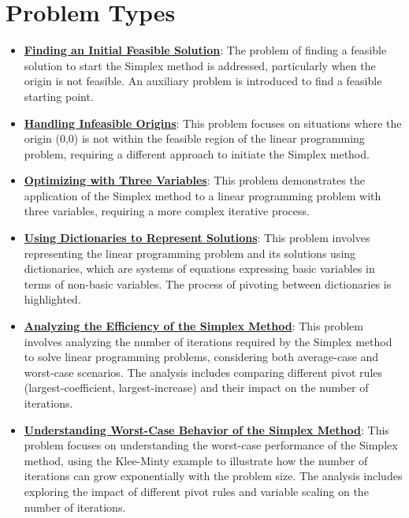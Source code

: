 \documentclass{article}%
\begin{document}
%
\section{Problem Types}%
\label{sec:ProblemTypes}%
\begin{itemize}[leftmargin=*]%
\item \href{https://www.math.purdue.edu/~yipn/421/2024-08-27-ExSimplex.pdf#page=32}{\textbf{Finding an Initial Feasible Solution}}: The problem of finding a feasible solution to start the Simplex method is addressed, particularly when the origin is not feasible. An auxiliary problem is introduced to find a feasible starting point.%
\item \href{https://www.math.purdue.edu/~yipn/421/2024-08-27-ExSimplex.pdf#page=30}{\textbf{Handling Infeasible Origins}}: This problem focuses on situations where the origin (0,0) is not within the feasible region of the linear programming problem, requiring a different approach to initiate the Simplex method.%
\item \href{https://www.math.purdue.edu/~yipn/421/2024-08-27-ExSimplex.pdf#page=17}{\textbf{Optimizing with Three Variables}}: This problem demonstrates the application of the Simplex method to a linear programming problem with three variables, requiring a more complex iterative process.%
\item \href{https://www.math.purdue.edu/~yipn/421/2024-08-27-ExSimplex.pdf#page=26}{\textbf{Using Dictionaries to Represent Solutions}}: This problem involves representing the linear programming problem and its solutions using dictionaries, which are systems of equations expressing basic variables in terms of non-basic variables. The process of pivoting between dictionaries is highlighted.%
\item \href{https://www.math.purdue.edu/~yipn/421/2024-09-05-SimplexEfficiency.pdf#page=1}{\textbf{Analyzing the Efficiency of the Simplex Method}}: This problem involves analyzing the number of iterations required by the Simplex method to solve linear programming problems, considering both average-case and worst-case scenarios. The analysis includes comparing different pivot rules (largest-coefficient, largest-increase) and their impact on the number of iterations.%
\item \href{https://www.math.purdue.edu/~yipn/421/2024-09-05-SimplexEfficiency.pdf#page=2}{\textbf{Understanding Worst{-}Case Behavior of the Simplex Method}}: This problem focuses on understanding the worst-case performance of the Simplex method, using the Klee-Minty example to illustrate how the number of iterations can grow exponentially with the problem size. The analysis includes exploring the impact of different pivot rules and variable scaling on the number of iterations.%

\end{itemize}
\end{document}

